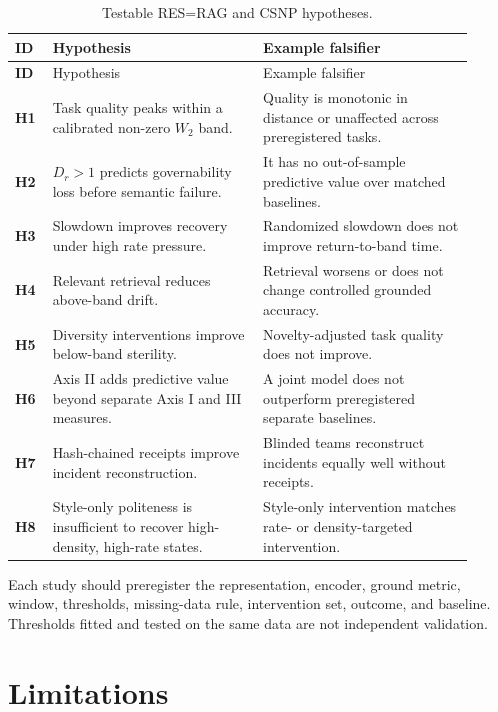\documentclass[11pt]{article}
\begin{document}
\renewcommand{\arraystretch}{1.16}
\begin{longtable}{>{\bfseries}p{0.07\linewidth}p{0.42\linewidth}p{0.42\linewidth}}
\caption{Testable RES=RAG and CSNP hypotheses.}
\label{tab:hypotheses}\\
\toprule
ID & Hypothesis & Example falsifier\\
\midrule
\endfirsthead
\toprule
ID & Hypothesis & Example falsifier\\
\midrule
\endhead
H1 & Task quality peaks within a calibrated non-zero $W_2$ band.
   & Quality is monotonic in distance or unaffected across preregistered tasks.\\
H2 & $D_r>1$ predicts governability loss before semantic failure.
   & It has no out-of-sample predictive value over matched baselines.\\
H3 & Slowdown improves recovery under high rate pressure.
   & Randomized slowdown does not improve return-to-band time.\\
H4 & Relevant retrieval reduces above-band drift.
   & Retrieval worsens or does not change controlled grounded accuracy.\\
H5 & Diversity interventions improve below-band sterility.
   & Novelty-adjusted task quality does not improve.\\
H6 & Axis II adds predictive value beyond separate Axis I and III measures.
   & A joint model does not outperform preregistered separate baselines.\\
H7 & Hash-chained receipts improve incident reconstruction.
   & Blinded teams reconstruct incidents equally well without receipts.\\
H8 & Style-only politeness is insufficient to recover high-density,
     high-rate states.
   & Style-only intervention matches rate- or density-targeted intervention.\\
\bottomrule
\end{longtable}

Each study should preregister the representation, encoder, ground metric,
window, thresholds, missing-data rule, intervention set, outcome, and baseline.
Thresholds fitted and tested on the same data are not independent validation.

\section{Limitations}
\end{document}
